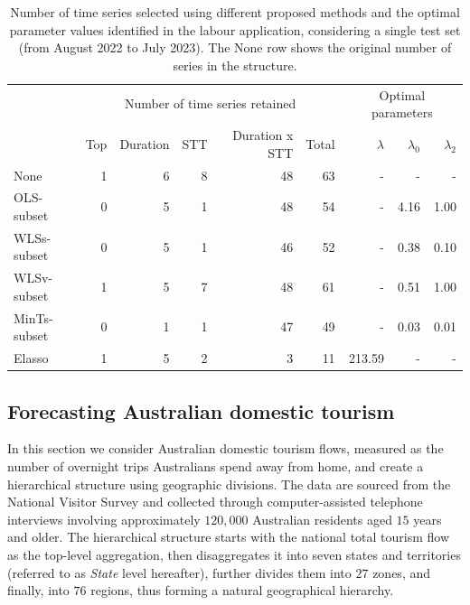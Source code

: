 \documentclass[
  12pt,
  11pt]{article}
\begin{document}
\hypertarget{tbl-labour-info}{}
\begin{table}[!h]
\caption{\label{tbl-labour-info}Number of time series selected using different proposed methods and the
optimal parameter values identified in the labour application,
considering a single test set (from August 2022 to July 2023). The None
row shows the original number of series in the structure. }\tabularnewline

\centering\begingroup\fontsize{10}{12}\selectfont

\begin{tabular}{lrrrrrrrr}
\toprule
\multicolumn{1}{c}{} & \multicolumn{5}{c}{Number of time series retained} & \multicolumn{3}{c}{Optimal parameters} \\
\cmidrule(l{3pt}r{3pt}){2-6} \cmidrule(l{3pt}r{3pt}){7-9}
  & Top & Duration & STT & Duration x STT & Total & $\lambda$ & $\lambda_0$ & $\lambda_2$\\
\midrule
None & 1 & 6 & 8 & 48 & 63 & - & - & -\\
OLS-subset & 0 & 5 & 1 & 48 & 54 & - & 4.16 & 1.00\\
WLSs-subset & 0 & 5 & 1 & 46 & 52 & - & 0.38 & 0.10\\
WLSv-subset & 1 & 5 & 7 & 48 & 61 & - & 0.51 & 1.00\\
MinTs-subset & 0 & 1 & 1 & 47 & 49 & - & 0.03 & 0.01\\
Elasso & 1 & 5 & 2 & 3 & 11 & 213.59 & - & -\\
\bottomrule
\end{tabular}
\endgroup{}
\end{table}

\hypertarget{sec-tourism}{%
\subsection{Forecasting Australian domestic tourism}\label{sec-tourism}}

In this section we consider Australian domestic tourism flows, measured
as the number of overnight trips Australians spend away from home, and
create a hierarchical structure using geographic divisions. The data are
sourced from the National Visitor Survey and collected through
computer-assisted telephone interviews involving approximately
\(120,000\) Australian residents aged \(15\) years and older. The
hierarchical structure starts with the national total tourism flow as
the top-level aggregation, then disaggregates it into seven states and
territories (referred to as \emph{State} level hereafter), further
divides them into \(27\) zones, and finally, into \(76\) regions, thus
forming a natural geographical hierarchy.
\end{document}
